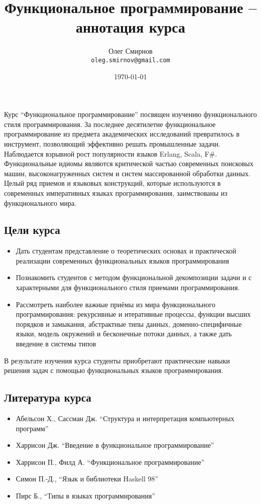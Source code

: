 \documentclass[a4paper,11pt]{article}
\author{Олег Смирнов \\
\texttt{oleg.smirnov@gmail.com}}
\date{\today}
\title{Функциональное программирование -- аннотация курса}
\begin{document}
\maketitle

Курс ``Функциональное программирование'' посвящен изучению функционального 
стиля программирования. За последнее десятилетие функциональное 
программирование из предмета академических исследований превратилось в
инструмент, позволяющий эффективно решать промышленные задачи. Наблюдается
взрывной рост популярности языков Erlang, Scala, F\#. Функциональные 
идиомы являются критической частью современных поисковых машин,
высоконагруженных систем и систем массированной обработки данных. Целый
ряд приемов и языковых конструкций, которые используются в современных
императивных языках программирования, заимствованы из функционального мира.

\subsection*{Цели курса}
\begin{itemize}
\item Дать студентам представление о теоретических основах и практической
реализации современных функциональных языков программирования
\item Познакомить студентов с методом функциональной декомпозиции задачи
и с характерными для функционального стиля приемами программирования.
\item Рассмотреть наиболее важные приёмы из мира функционального
программирования: рекурсивные и итеративные процессы, функции высших порядков
и замыкания, абстрактные типы данных, доменно-специфичные языки, модель
окружений и бесконечные потоки данных, а также дать введение в системы типов
\end{itemize}

В результате изучения курса студенты приобретают практические навыки
решения задач с помощью функциональных языков программирования.

\subsection*{Литература курса}
\begin{itemize}
\item Абельсон Х., Сассман Дж. ``Структура и интерпретация компьютерных программ''
\item Харрисон Дж. ``Введение в функциональное программирование''
\item Харрисон П., Филд А. ``Функциональное программирование''
\item Симон П.-Д., ``Язык и библиотеки Haskell 98''
\item Пирс Б., ``Типы в языках программирования''
\end{itemize}
\end{document}
